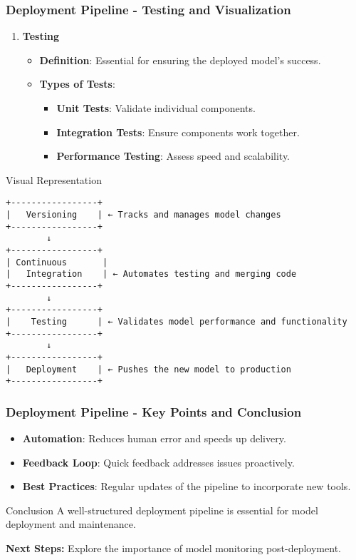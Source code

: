 \documentclass[aspectratio=169]{beamer}
\begin{document}
\begin{frame}[fragile]
    \frametitle{Deployment Pipeline - Testing and Visualization}
    \begin{enumerate}[resume]
        \item \textbf{Testing}
        \begin{itemize}
            \item \textbf{Definition}: Essential for ensuring the deployed model’s success.
            \item \textbf{Types of Tests}:
            \begin{itemize}
                \item \textbf{Unit Tests}: Validate individual components.
                \item \textbf{Integration Tests}: Ensure components work together.
                \item \textbf{Performance Testing}: Assess speed and scalability.
            \end{itemize}
        \end{itemize}
    \end{enumerate}
    \begin{block}{Visual Representation}
        \begin{center}
            \begin{verbatim}
+-----------------+
|   Versioning    | ← Tracks and manages model changes
+-----------------+
        ↓
+-----------------+
| Continuous       |
|   Integration    | ← Automates testing and merging code
+-----------------+
        ↓
+-----------------+
|    Testing      | ← Validates model performance and functionality
+-----------------+
        ↓
+-----------------+
|   Deployment    | ← Pushes the new model to production 
+-----------------+
            \end{verbatim}
        \end{center}
    \end{block}
\end{frame}

\begin{frame}[fragile]
    \frametitle{Deployment Pipeline - Key Points and Conclusion}
    \begin{itemize}
        \item \textbf{Automation}: Reduces human error and speeds up delivery.
        \item \textbf{Feedback Loop}: Quick feedback addresses issues proactively.
        \item \textbf{Best Practices}: Regular updates of the pipeline to incorporate new tools.
    \end{itemize}
    \begin{block}{Conclusion}
        A well-structured deployment pipeline is essential for model deployment and maintenance.
    \end{block}
    \textbf{Next Steps:} Explore the importance of model monitoring post-deployment.
\end{frame}
\end{document}

